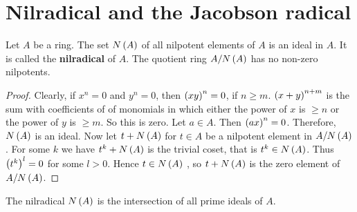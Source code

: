 \pagebreak

\section{Nilradical and the Jacobson radical}


\begin{proposition}
Let $ A $ be a ring. The set $ N\left( A \right) $ of all nilpotent elements of $ A $ is an ideal in $ A $. It is called the \textbf{nilradical} of $ A $. The quotient ring $ A / N\left( A \right) $ has no non-zero nilpotents.
\end{proposition}

\begin{proof}
Clearly, if $ x^n = 0 $ and $ y^n = 0 $, then $ \left( xy \right)^n = 0 $, if $ n \ge m $. $ \left( x + y \right)^{n + m} $ is the sum with coefficients of of monomials in which either the power of $ x $ is $ \ge n $ or the power of $ y $ is $ \ge m $. So this is zero. Let $ a \in A $. Then $ \left( ax \right)^n = 0 $. Therefore, $ N\left( A \right) $ is an ideal. Now let $ t + N\left( A \right) $ for $ t \in A $ be a nilpotent element in $ A / N\left( A \right) $. For some $ k $ we have $ t^k + N\left( A \right) $ is the trivial coset, that is $ t^k \in N\left( A \right) $. Thus $ \left( t^k \right)^l = 0 $ for some $ l > 0 $. Hence $ t \in N\left( A \right) $ , so $ t + N\left( A \right) $ is the zero element of $ A / N\left( A \right) $.
\end{proof}

\begin{proposition}
The nilradical $ N\left( A \right) $ is the intersection of all prime ideals of $ A $.
\end{proposition}

